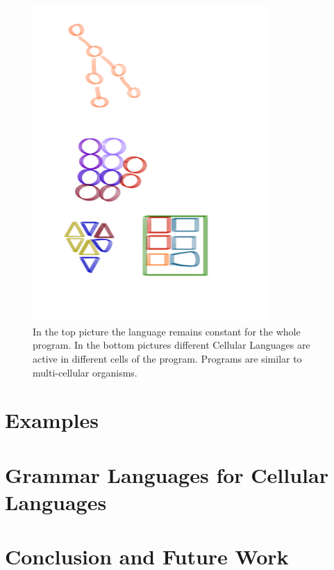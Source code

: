 \documentclass[journal]{IEEEtran}
\begin{document}
\begin{figure}[ht!]
\centering
\includegraphics[width=90mm]{sketch.png}
\caption{In the top picture the language remains constant for the whole program. In the bottom pictures different Cellular Languages are active in different cells of the program. Programs are similar to multi-cellular organisms.}
\end{figure}

\section{Examples}

\section{Grammar Languages for Cellular Languages}

\section{Conclusion and Future Work}
\end{document}
